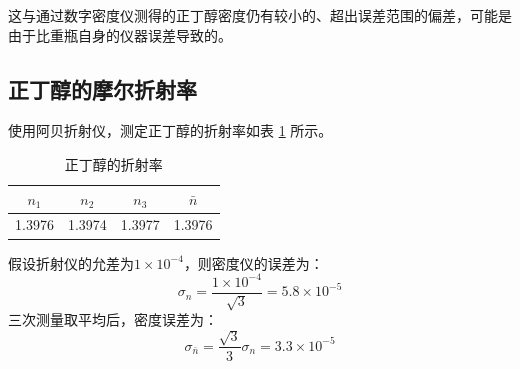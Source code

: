 \documentclass[cn,hazy,pku,12pt,normal,math=newtx,cite=super]{elegantnote}
\begin{document}
这与通过数字密度仪测得的正丁醇密度仍有较小的、超出误差范围的偏差，可能是由于比重瓶自身的仪器误差导致的。

\subsection{正丁醇的摩尔折射率}

使用阿贝折射仪，测定正丁醇的折射率如表 \ref{tab:4} 所示。

\begin{table}[htbp]
    \centering
    \caption{正丁醇的折射率}
    \begin{tabular}{cccc}
    \toprule
         $n_1$ & $n_2$ & $n_3$ & $\bar{n}$ \\
         \midrule
         1.3976 & 1.3974 & 1.3977 & 1.3976\\
         \bottomrule
    \end{tabular}
    \label{tab:4}
\end{table}

假设折射仪的允差为$1\times 10^{-4}$，则密度仪的误差为：
\begin{equation*}
    \sigma_{n} = \frac{1\times 10^{-4}}{\sqrt{3}} = 5.8 \times 10^{-5}
\end{equation*}
三次测量取平均后，密度误差为：
\begin{equation*}
    \sigma_{\bar{n}} = \frac{\sqrt{3}}{3}\sigma_{n} = 3.3 \times 10^{-5}
\end{equation*}
\end{document}
